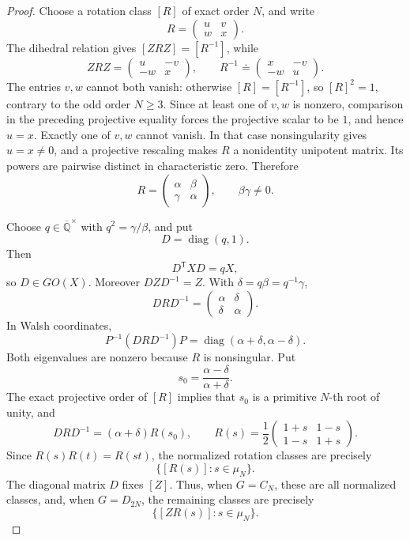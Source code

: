 \documentclass[11pt,letterpaper,onecolumn]{article}
\theoremstyle{plain}
\theoremstyle{definition}
\theoremstyle{remark}
\newcommand{\AlgNums}{\overline{\mathbb Q}}
\newcommand{\diag}{\operatorname{diag}}
\begin{document}
\begin{proof}
		Choose a rotation class \([R]\) of exact order \(N\), and write
		\[
		R=\begin{pmatrix}u&v\\w&x\end{pmatrix}.
		\]
		The dihedral relation gives \([ZRZ]=[R^{-1}]\), while
		\[
		ZRZ=\begin{pmatrix}u&-v\\-w&x\end{pmatrix},
		\qquad
		R^{-1}\doteq\begin{pmatrix}x&-v\\-w&u\end{pmatrix}.
		\]
		The entries \(v,w\) cannot both vanish: otherwise \([R]=[R^{-1}]\), so
		\([R]^2=1\), contrary to the odd order \(N\ge3\).  Since at least one of
		\(v,w\) is nonzero, comparison in the preceding projective equality forces
		the projective scalar to be \(1\), and hence \(u=x\).  Exactly one of
		\(v,w\) cannot vanish.  In that case nonsingularity gives \(u=x\ne0\), and
		a projective rescaling makes \(R\) a nonidentity unipotent matrix. Its
		powers are pairwise distinct in characteristic zero.  Therefore
		\[
		R=\begin{pmatrix}\alpha&\beta\\ \gamma&\alpha\end{pmatrix},
		\qquad \beta\gamma\ne0.
		\]
		
		Choose \(q\in\AlgNums^\times\) with \(q^2=\gamma/\beta\), and put
		\[
		D=\diag(q,1).
		\]
		Then
		\[
		D^{\mathsf T}XD=qX,
		\]
		so \(D\in GO(X)\). Moreover \(DZD^{-1}=Z\).  With
		\(\delta=q\beta=q^{-1}\gamma\),
		\[
		DRD^{-1}
		=\begin{pmatrix}\alpha&\delta\\ \delta&\alpha\end{pmatrix}.
		\]
		In Walsh coordinates,
		\[
		P^{-1}(DRD^{-1})P
		=\diag(\alpha+\delta,\alpha-\delta).
		\]
		Both eigenvalues are nonzero because \(R\) is nonsingular.  Put
		\[
		s_0=\frac{\alpha-\delta}{\alpha+\delta}.
		\]
		The exact projective order of \([R]\) implies that \(s_0\) is a primitive
		\(N\)-th root of unity, and
		\[
		DRD^{-1}
		=(\alpha+\delta)R(s_0),
		\qquad
		R(s)=\frac12\begin{pmatrix}1+s&1-s\\1-s&1+s\end{pmatrix}.
		\]
		Since \(R(s)R(t)=R(st)\), the normalized rotation classes are precisely
		\[
		\{[R(s)]:s\in\mu_N\}.
		\]
		The diagonal matrix \(D\) fixes \([Z]\).  Thus, when \(G=C_N\), these are
		all normalized classes, and, when \(G=D_{2N}\), the remaining classes are
		precisely
		\[
		\{[ZR(s)]:s\in\mu_N\}.
		\]
		

\end{proof}
\end{document}
